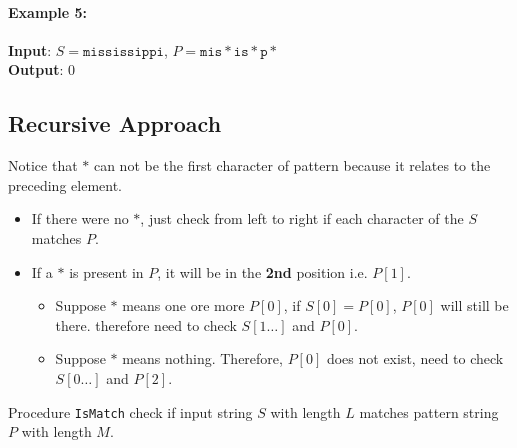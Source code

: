 \paragraph{Example 5:}
\begin{flushleft}
\textbf{Input}: $S = \texttt{mississippi}$, $P = \texttt{mis}\ast\texttt{is}\ast\texttt{p}\ast$
\\
\textbf{Output}: 0
\end{flushleft}

\subsection{Recursive Approach}
Notice that {\color{red}$\ast$} can not be the first character of pattern because it relates to the {\color{red}preceding} element.
\begin{itemize}
\item If there were no {\color{red}$\ast$}, just check from left to right if each character of the $S$ matches $P$.
\item If a {\color{red}$\ast$} is present in $P$, it will be in the \textbf{\color{red}2nd} position i.e. $P[1]$. 
\begin{itemize}
\item Suppose $\ast$ means one ore more $P[0]$, if $S[0]=P[0]$, $P[0]$ will still be there. therefore need to check $S[1\ldots]$ and $P[0]$.
\item Suppose $\ast$ means nothing. Therefore, $P[0]$ does not exist, need to check $S[0\ldots]$ and $P[2]$.
\end{itemize}
\end{itemize}

Procedure \texttt{IsMatch} check if input string $S$ with length $L$ matches pattern string $P$ with length $M$. 

